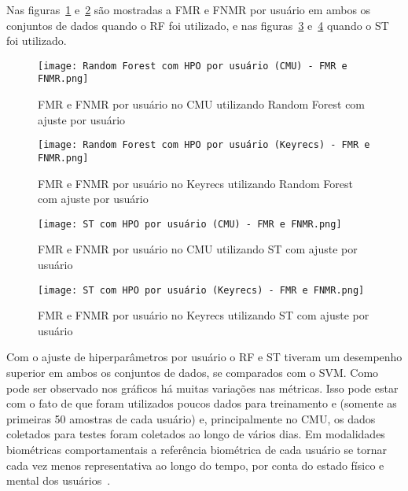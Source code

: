 Nas figuras~\ref{fig:rf_hpo_user_cmu} e~\ref{fig:rf_hpo_user_keyrecs} são mostradas a FMR e FNMR por usuário em ambos os conjuntos de dados quando o RF foi utilizado, e nas figuras~\ref{fig:st_hpo_user_cmu} e~\ref{fig:st_hpo_user_keyrecs} quando o ST foi utilizado.

\begin{figure}[htbp]
    \centering
    \texttt{[image: Random Forest com HPO por usuário (CMU) - FMR e FNMR.png]}
    \caption{FMR e FNMR por usuário no CMU utilizando Random Forest com ajuste por usuário}\label{fig:rf_hpo_user_cmu}
\end{figure}

\begin{figure}[htbp]
    \centering
    \texttt{[image: Random Forest com HPO por usuário (Keyrecs) - FMR e FNMR.png]}
    \caption{FMR e FNMR por usuário no Keyrecs utilizando Random Forest com ajuste por usuário}\label{fig:rf_hpo_user_keyrecs}
\end{figure}

\begin{figure}[htbp]
    \centering
    \texttt{[image: ST com HPO por usuário (CMU) - FMR e FNMR.png]}
    \caption{FMR e FNMR por usuário no CMU utilizando ST com ajuste por usuário}\label{fig:st_hpo_user_cmu}
\end{figure}

\begin{figure}[htbp]
    \centering
    \texttt{[image: ST com HPO por usuário (Keyrecs) - FMR e FNMR.png]}
    \caption{FMR e FNMR por usuário no Keyrecs utilizando ST com ajuste por usuário}\label{fig:st_hpo_user_keyrecs}
\end{figure}

Com o ajuste de hiperparâmetros por usuário o RF e ST tiveram um desempenho superior em ambos os conjuntos de dados, se comparados com o SVM. Como pode ser observado nos gráficos há muitas variações nas métricas. Isso pode estar com o fato de que foram utilizados poucos dados para treinamento e (somente as primeiras 50 amostras de cada usuário) e, principalmente no CMU, os dados coletados para testes foram coletados ao longo de vários dias. Em modalidades biométricas comportamentais a referência biométrica de cada usuário se tornar cada vez menos representativa ao longo do tempo, por conta do estado físico e mental dos usuários~\cite{keystroke_template_update_with_adapted_thresholds}.

